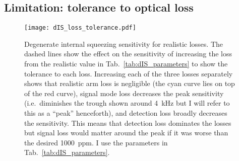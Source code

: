


\subsection{Limitation: tolerance to optical loss}
\label{sec:dIS_optical_loss}

\begin{figure}
	\centering
	\texttt{[image: dIS\_loss\_tolerance.pdf]}
	\caption{Degenerate internal squeezing sensitivity for realistic losses. The dashed lines show the effect on the sensitivity of increasing the loss from the realistic value in Tab.~\ref{tab:dIS_parameters} to show the tolerance to each loss. Increasing each of the three losses separately shows that realistic arm loss is negligible (the cyan curve lies on top of the red curve), signal mode loss decreases the peak sensitivity (i.e.\ diminishes the trough shown around 4~kHz but I will refer to this as a ``peak'' henceforth), and detection loss broadly decreases the sensitivity. This means that detection loss dominates the losses but signal loss would matter around the peak if it was worse than the desired 1000~ppm. I use the parameters in Tab.~\ref{tab:dIS_parameters}.}
	\label{fig:dIS_loss_tolerance}
\end{figure}

